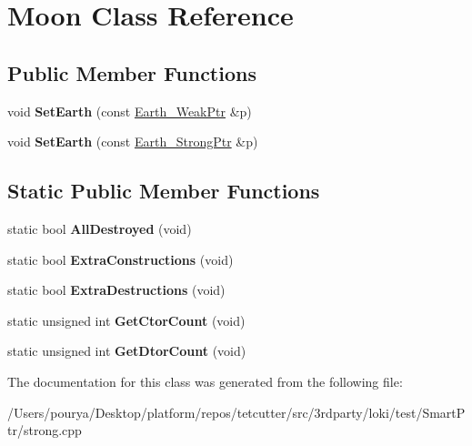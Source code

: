 \hypertarget{classMoon}{}\section{Moon Class Reference}
\label{classMoon}
\subsection*{Public Member Functions}
\begin{DoxyCompactItemize}
\item 
\hypertarget{classMoon_a4bfc90b7ff831f4b3bffd3c7d63591b7}{}void {\bfseries Set\+Earth} (const \hyperlink{classLoki_1_1StrongPtr}{Earth\+\_\+\+Weak\+Ptr} \&p)\label{classMoon_a4bfc90b7ff831f4b3bffd3c7d63591b7}

\item 
\hypertarget{classMoon_afd9b888c2f418dee2b3f568e38dabea4}{}void {\bfseries Set\+Earth} (const \hyperlink{classLoki_1_1StrongPtr}{Earth\+\_\+\+Strong\+Ptr} \&p)\label{classMoon_afd9b888c2f418dee2b3f568e38dabea4}

\end{DoxyCompactItemize}
\subsection*{Static Public Member Functions}
\begin{DoxyCompactItemize}
\item 
\hypertarget{classMoon_a009980811d0defe0558286d9c40a36eb}{}static bool {\bfseries All\+Destroyed} (void)\label{classMoon_a009980811d0defe0558286d9c40a36eb}

\item 
\hypertarget{classMoon_a214412989fcbee06285196d55275030b}{}static bool {\bfseries Extra\+Constructions} (void)\label{classMoon_a214412989fcbee06285196d55275030b}

\item 
\hypertarget{classMoon_a948e3d636248148d780d0d0701170393}{}static bool {\bfseries Extra\+Destructions} (void)\label{classMoon_a948e3d636248148d780d0d0701170393}

\item 
\hypertarget{classMoon_a7ab71edd3a4bd4a954f8f15383168199}{}static unsigned int {\bfseries Get\+Ctor\+Count} (void)\label{classMoon_a7ab71edd3a4bd4a954f8f15383168199}

\item 
\hypertarget{classMoon_a80ce5ba086ce6d52a5eccd56993549c3}{}static unsigned int {\bfseries Get\+Dtor\+Count} (void)\label{classMoon_a80ce5ba086ce6d52a5eccd56993549c3}

\end{DoxyCompactItemize}


The documentation for this class was generated from the following file\+:\begin{DoxyCompactItemize}
\item 
/\+Users/pourya/\+Desktop/platform/repos/tetcutter/src/3rdparty/loki/test/\+Smart\+Ptr/strong.\+cpp\end{DoxyCompactItemize}
